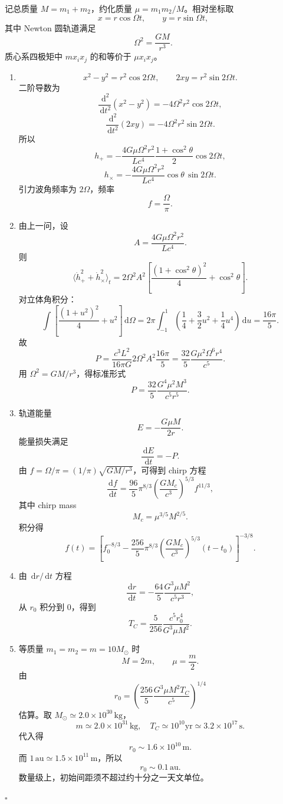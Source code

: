 \documentclass[UTF8,12pt]{ctexart}
\newcommand{\dd}{\,\mathrm d}
\newenvironment{solution}{%
  \par\medskip
  \noindent{\bfseries 解答}\quad\ignorespaces
}{\hfill$\square$\par\medskip}
\begin{document}
\begin{solution}
记总质量 \(M=m_1+m_2\)，约化质量 \(\mu=m_1m_2/M\)。相对坐标取
\[
x=r\cos\Omega t,\qquad y=r\sin\Omega t,
\]
其中 Newton 圆轨道满足
\[
\Omega^2=\frac{GM}{r^3}.
\]
质心系四极矩中 \(m x_ix_j\) 的和等价于 \(\mu x_ix_j\)。
\begin{enumerate}[label=(\arabic*)]
\item
\[
x^2-y^2=r^2\cos2\Omega t,\qquad
2xy=r^2\sin2\Omega t.
\]
二阶导数为
\[
\frac{\dd^2}{\dd t^2}(x^2-y^2)=-4\Omega^2r^2\cos2\Omega t,
\]
\[
\frac{\dd^2}{\dd t^2}(2xy)=-4\Omega^2r^2\sin2\Omega t.
\]
所以
\[
h_+=-\frac{4G\mu\Omega^2r^2}{Lc^4}
\frac{1+\cos^2\theta}{2}\cos2\Omega t,
\]
\[
h_\times=-\frac{4G\mu\Omega^2r^2}{Lc^4}
\cos\theta\,\sin2\Omega t.
\]
引力波角频率为 \(2\Omega\)，频率
\[
f=\frac{\Omega}{\pi}.
\]

\item 由上一问，设
\[
A=\frac{4G\mu\Omega^2r^2}{Lc^4}.
\]
则
\[
\langle\dot h_+^2+\dot h_\times^2\rangle_t
=2\Omega^2A^2\left[
\frac{(1+\cos^2\theta)^2}{4}+\cos^2\theta
\right].
\]
对立体角积分：
\[
\int\left[
\frac{(1+u^2)^2}{4}+u^2
\right]\dd\Omega
=2\pi\int_{-1}^1\left(\frac14+\frac32u^2+\frac14u^4\right)\dd u
=\frac{16\pi}{5}.
\]
故
\[
P=\frac{c^3L^2}{16\pi G}
2\Omega^2A^2\frac{16\pi}{5}
=\frac{32}{5}\frac{G\mu^2\Omega^6r^4}{c^5}.
\]
用 \(\Omega^2=GM/r^3\)，得标准形式
\[
P=\frac{32}{5}\frac{G^4\mu^2M^3}{c^5r^5}.
\]

\item 轨道能量
\[
E=-\frac{G\mu M}{2r}.
\]
能量损失满足
\[
\frac{\dd E}{\dd t}=-P.
\]
由 \(f=\Omega/\pi=(1/\pi)\sqrt{GM/r^3}\)，可得到 chirp 方程
\[
\frac{\dd f}{\dd t}
=\frac{96}{5}\pi^{8/3}
\left(\frac{GM_c}{c^3}\right)^{5/3}f^{11/3},
\]
其中 chirp mass
\[
M_c=\mu^{3/5}M^{2/5}.
\]
积分得
\[
f(t)=\left[
f_0^{-8/3}
-\frac{256}{5}\pi^{8/3}
\left(\frac{GM_c}{c^3}\right)^{5/3}(t-t_0)
\right]^{-3/8}.
\]

\item 由 \(\dd r/\dd t\) 方程
\[
\frac{\dd r}{\dd t}
=-\frac{64}{5}\frac{G^3\mu M^2}{c^5r^3},
\]
从 \(r_0\) 积分到 \(0\)，得到
\[
T_C=\frac{5}{256}
\frac{c^5r_0^4}{G^3\mu M^2}.
\]

\item 等质量 \(m_1=m_2=m=10M_\odot\) 时
\[
M=2m,\qquad \mu=\frac m2.
\]
由
\[
r_0=\left(\frac{256}{5}\frac{G^3\mu M^2T_C}{c^5}\right)^{1/4}
\]
估算。取 \(M_\odot\simeq2.0\times10^{30}\,\mathrm{kg}\)，
\[
m\simeq2.0\times10^{31}\,\mathrm{kg},\quad
T_C\simeq10^{10}\mathrm{yr}\simeq3.2\times10^{17}\,\mathrm{s}.
\]
代入得
\[
r_0\sim 1.6\times10^{10}\,\mathrm m.
\]
而 \(1\,\mathrm{au}\simeq1.5\times10^{11}\,\mathrm m\)，所以
\[
r_0\sim 0.1\,\mathrm{au}.
\]
数量级上，初始间距须不超过约十分之一天文单位。
\end{enumerate}
\end{solution}
\end{document}
